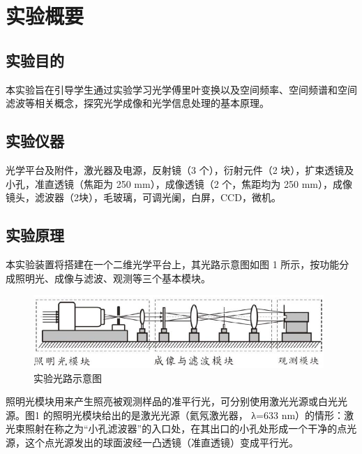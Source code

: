 \documentclass[a4paper]{article}
\begin{document}


\section{实验概要}
\subsection{实验目的}
\hspace{2em}本实验旨在引导学生通过实验学习光学傅里叶变换以及空间频率、空间频谱和空间滤波等相关概念，探究光学成像和光学信息处理的基本原理。

%
\subsection{实验仪器}
\hspace{2em}光学平台及附件，激光器及电源，反射镜（3 个），衍射元件（2 块），扩束透镜及小孔，准直透镜（焦距为 250 mm），成像透镜（2 个，焦距均为 250 mm），成像镜头，滤波器（2块），毛玻璃，可调光阑，白屏，CCD，微机。

\subsection{实验原理}
\hspace{2em}本实验装置将搭建在一个二维光学平台上，其光路示意图如图 1 所示，按功能分成照明光、成像与滤波、观测等三个基本模块。\par

\begin{figure}[htbp]
    \centering
    \captionsetup{justification=centering,margin=2cm}
    \includegraphics[width=110mm]{fig1.png}
    \caption{实验光路示意图}
\end{figure}

\hspace{2em}照明光模块用来产生照亮被观测样品的准平行光，可分别使用激光光源或白光光源。图1 的照明光模块给出的是激光光源（氦氖激光器， λ=633 nm）的情形：激光束照射在称之为“小孔滤波器”的入口处，在其出口的小孔处形成一个干净的点光源，这个点光源发出的球面波经一凸透镜（准直透镜）变成平行光。\par
\end{document}
